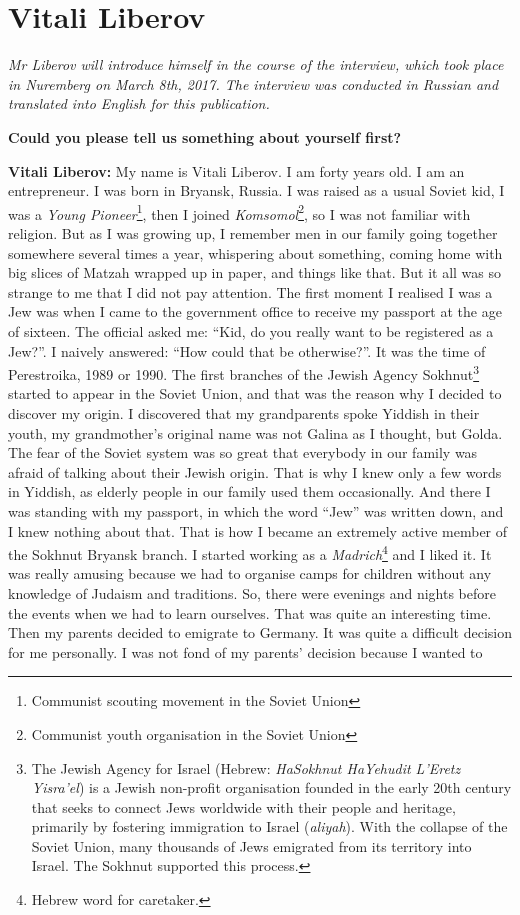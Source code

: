 \section{Vitali Liberov}

\textit{Mr Liberov will introduce himself in the course of the interview, which took place in Nuremberg on March 8th, 2017. The interview was conducted in Russian and translated into English for this publication.}\par
\vspace*{2em}

\textbf{Could you please tell us something about yourself first?} 

\textbf{Vitali Liberov:} My name is Vitali Liberov. I am forty years old. I am an entrepreneur. I was born in Bryansk, Russia. I was raised as a usual Soviet kid, I was a \textit{Young Pioneer}\footnote{Communist scouting movement in the Soviet Union}, then I joined \textit{Komsomol}\footnote{Communist youth organisation in the Soviet Union}, so I was not familiar with religion. But as I was growing up, I remember men in our family going together somewhere several times a year, whispering about something, coming home with big slices of Matzah wrapped up in paper, and things like that. But it all was so strange to me that I did not pay attention. The first moment I realised I was a Jew was when I came to the government office to receive my passport at the age of sixteen. The official asked me: “Kid, do you really want to be registered as a Jew?”. I naively answered: “How could that be otherwise?”. It was the time of Perestroika, 1989 or 1990. The first branches of the Jewish Agency Sokhnut\footnote{The Jewish Agency for Israel (Hebrew: \textit{HaSokhnut HaYehudit L'Eretz Yisra'el}) is a Jewish non-profit organisation founded in the early 20th century that seeks to connect Jews worldwide with their people and heritage, primarily by fostering immigration to Israel (\textit{aliyah}). With the collapse of the Soviet Union, many thousands of Jews emigrated from its territory into Israel. The Sokhnut supported this process.} started to appear in the Soviet Union, and that was the reason why I decided to discover my origin. I discovered that my grandparents spoke Yiddish in their youth, my grandmother’s original name was not Galina as I thought, but Golda. The fear of the Soviet system was so great that everybody in our family was afraid of talking about their Jewish origin. That is why I knew only a few words in Yiddish, as elderly people in our family used them occasionally. And there I was standing with my passport, in which the word “Jew” was written down, and I knew nothing about that. That is how I became an extremely active member of the Sokhnut Bryansk branch. I started working as a \textit{Madrich}\footnote{Hebrew word for caretaker.} and I liked it.  It was really amusing because we had to organise camps for children without any knowledge of Judaism and traditions. So, there were evenings and nights before the events when we had to learn ourselves. That was quite an interesting time. Then my parents decided to emigrate to Germany. It was quite a difficult decision for me personally. I was not fond of my parents’ decision because I wanted to 